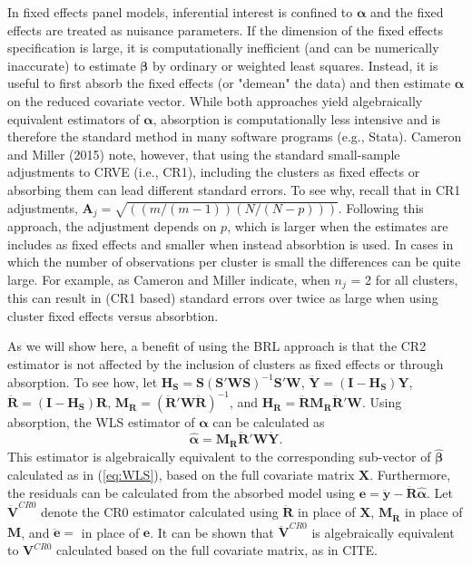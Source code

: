 \documentclass[12pt]{article}\usepackage[]{graphicx}\usepackage[]{color}
\newcommand{\bm}{\mathbf}
\newcommand{\bs}{\boldsymbol}
\begin{document}
In fixed effects panel models, inferential interest is confined to $\bs{\alpha}$ and the fixed effects are treated as nuisance parameters. If the dimension of the fixed effects specification is large, it is computationally inefficient (and can be numerically inaccurate) to estimate $\bs\beta$ by ordinary or weighted least squares. Instead, it is useful to first absorb the fixed effects (or "demean" the data) and then estimate $\bs\alpha$ on the reduced covariate vector.
While both approaches yield algebraically equivalent estimators of $\bs\alpha$, absorption is computationally less intensive and is therefore the standard method in many software programs (e.g., Stata). Cameron and Miller (2015) note, however, that using the standard small-sample adjustments to CRVE (i.e., CR1), including the clusters as fixed effects or absorbing them can lead different standard errors. To see why, recall that in CR1 adjustments, $\bm{A}_j = \sqrt{((m/(m-1))(N/(N-p)))}$. Following this approach, the adjustment depends on $p$, which is larger when the estimates are includes as fixed effects and smaller when instead absorbtion is used. In cases in which the number of observations per cluster is small the differences can be quite large. For example, as Cameron and Miller indicate, when $n_j$ = 2 for all clusters, this can result in (CR1 based) standard errors over twice as large when using cluster fixed effects versus absorbtion. 


As we will show here, a benefit of using the BRL approach is that the CR2 estimator is not affected by the inclusion of clusters as fixed effects or through absorption. To see how, let $\bm{H_S} = \bm{S}\left(\bm{S}'\bm{W}\bm{S}\right)^{-1} \bm{S}'\bm{W}$, $\bm{\ddot{Y}} = \left(\bm{I} - \bm{H_S}\right)\bm{Y}$, $\bm{\ddot{R}} = \left(\bm{I} - \bm{H_S}\right)\bm{R}$, $\bm{M_{\ddot{R}}} = \left(\bm{\ddot{R}}' \bm{W} \bm{\ddot{R}}\right)^{-1}$, and $\bm{H_{\ddot{R}}} = \bm{\ddot{R}}\bm{M_{\ddot{R}}} \bm{\ddot{R}}' \bm{W}$. 
Using absorption, the WLS estimator of $\bs\alpha$ can be calculated as \[
\bs{\hat\alpha} = \bm{M_{\ddot{R}}} \bm{\ddot{R}}' \bm{W} \bm{\ddot{Y}}. \]
This estimator is algebraically equivalent to the corresponding sub-vector of $\bs{\hat\beta}$  calculated as in (\ref{eq:WLS}), based on the full covariate matrix $\bm{X}$. 
Furthermore, the residuals can be calculated from the absorbed model using $\bm{e} = \bm{\ddot{y}} - \bm{\ddot{R}} \bs{\hat\alpha}$.
Let $\bm{\ddot{V}}^{CR0}$ denote the CR0 estimator calculated using $\bm{\ddot{R}}$ in place of $\bm{X}$, $\bm{M_{\ddot{R}}}$ in place of $\bm{M}$, and $\bm{\ddot{e}} = $ in place of $\bm{e}$. It can be shown that $\bm{\ddot{V}}^{CR0}$ is algebraically equivalent to $\bm{V}^{CR0}$ calculated based on the full covariate matrix, as in CITE.
\end{document}
